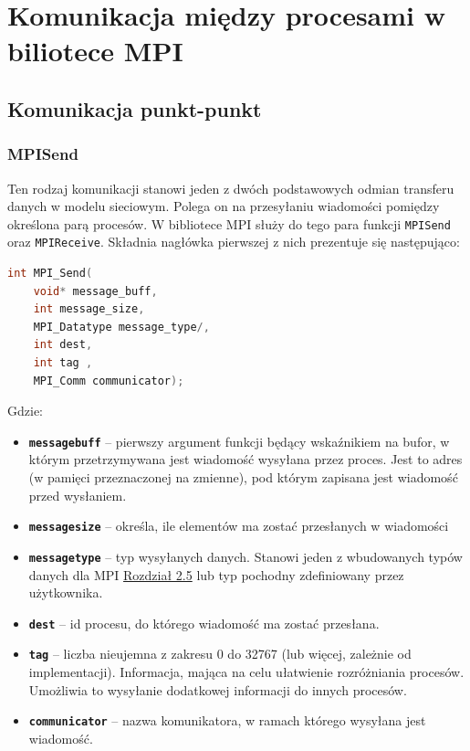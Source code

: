 \section{Komunikacja między procesami w biliotece MPI}

\subsection{Komunikacja punkt-punkt}

\subsubsection{MPI\textunderscore Send}
Ten rodzaj komunikacji stanowi jeden z dwóch podstawowych odmian transferu danych w modelu sieciowym. Polega on na przesyłaniu wiadomości pomiędzy określona parą procesów. W bibliotece MPI służy do tego para funkcji \texttt{MPI\textunderscore Send} oraz \texttt{MPI\textunderscore Receive}. Składnia nagłówka pierwszej z nich prezentuje się następująco: 
\begin{lstlisting}[language=C]
int MPI_Send(
	void* message_buff,
	int message_size,
	MPI_Datatype message_type/,
	int dest,
	int tag ,
	MPI_Comm communicator);
\end{lstlisting}

Gdzie:
\begin{itemize}
	\item \texttt{\textbf{message\textunderscore buff}} -- pierwszy argument funkcji będący wskaźnikiem na bufor, w którym przetrzymywana jest wiadomość wysyłana przez proces. Jest to adres (w pamięci przeznaczonej na zmienne), pod którym zapisana jest wiadomość przed wysłaniem.
	\item \texttt{\textbf{message\textunderscore size}} -- określa, ile elementów ma zostać przesłanych w wiadomości
	\item \texttt{\textbf{message\textunderscore type}} -- typ wysyłanych danych. Stanowi jeden z wbudowanych typów danych dla MPI \hyperref[table:datatypes]{Rozdział 2.5} lub typ pochodny zdefiniowany przez użytkownika.
	\item \texttt{\textbf{dest}} -- id procesu, do którego wiadomość ma zostać przesłana.
	\item \texttt{\textbf{tag}} -- liczba nieujemna z zakresu 0 do 32767 (lub więcej, zależnie od implementacji). Informacja, mająca na celu ułatwienie rozróżniania procesów. Umożliwia to wysyłanie dodatkowej informacji do innych procesów.
	\item \texttt{\textbf{communicator}} -- nazwa komunikatora, w ramach którego wysyłana jest wiadomość.
\end{itemize}

